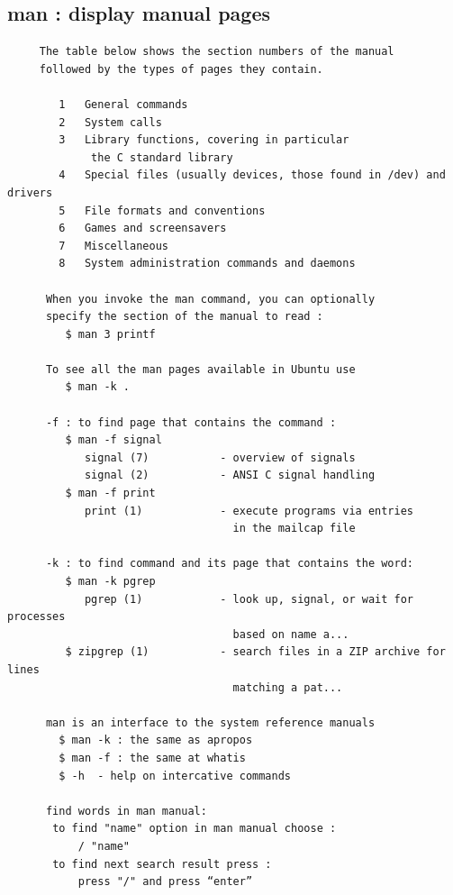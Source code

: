 \documentclass[a4paper,12pt]{article}
\begin{document}
\subsection{man     : display manual pages}
\begin{verbatim}
     The table below shows the section numbers of the manual
     followed by the types of pages they contain.

        1	General commands
        2	System calls
        3	Library functions, covering in particular 
             the C standard library
        4	Special files (usually devices, those found in /dev) and drivers
        5	File formats and conventions
        6	Games and screensavers
        7	Miscellaneous
        8	System administration commands and daemons       
     
      When you invoke the man command, you can optionally
      specify the section of the manual to read :  
         $ man 3 printf
     
      To see all the man pages available in Ubuntu use 
         $ man -k .
     
      -f : to find page that contains the command :
         $ man -f signal
            signal (7)           - overview of signals
            signal (2)           - ANSI C signal handling
         $ man -f print
            print (1)            - execute programs via entries
                                   in the mailcap file     

      -k : to find command and its page that contains the word:
         $ man -k pgrep
            pgrep (1)            - look up, signal, or wait for processes   
                                   based on name a...
         $ zipgrep (1)           - search files in a ZIP archive for lines 
                                   matching a pat...

      man is an interface to the system reference manuals
        $ man -k : the same as apropos
        $ man -f : the same at whatis
        $ -h  - help on intercative commands
     
      find words in man manual:
       to find "name" option in man manual choose : 
           / "name"
       to find next search result press : 
           press "/" and press “enter”
\end{verbatim}
\end{document}
